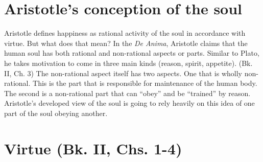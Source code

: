 \documentclass[oneside]{article}
\begin{document}
\section*{Aristotle's conception of the soul}
Aristotle defines happiness as rational activity of the soul in accordance with virtue. But what does that mean?  In the \emph{De Anima}, Aristotle claims that the human soul has both rational and non-rational aspects or parts. Similar to Plato, he takes motivation to come in three main kinds (reason, spirit, appetite).  (Bk. II, Ch. 3)
The non-rational aspect itself has two aspects. One that is wholly non-rational. This is the part that is responsible for maintenance of the human body. The second is a non-rational part that can ``obey'' and be ``trained'' by reason. Aristotle's developed view of the soul is going to rely heavily on this idea of one part of the soul obeying another. 

\section*{Virtue (Bk. II, Chs. 1-4)}
\end{document}
